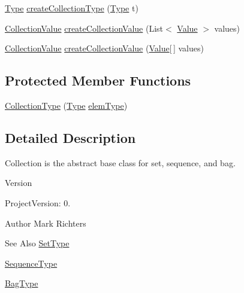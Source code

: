 \begin{DoxyCompactItemize}
\item 
\hyperlink{interfaceorg_1_1tzi_1_1use_1_1uml_1_1ocl_1_1type_1_1_type}{Type} \hyperlink{classorg_1_1tzi_1_1use_1_1uml_1_1ocl_1_1type_1_1_collection_type_a47db435ac4e69e64dc5634828d3672ad}{create\-Collection\-Type} (\hyperlink{interfaceorg_1_1tzi_1_1use_1_1uml_1_1ocl_1_1type_1_1_type}{Type} t)
\item 
\hyperlink{classorg_1_1tzi_1_1use_1_1uml_1_1ocl_1_1value_1_1_collection_value}{Collection\-Value} \hyperlink{classorg_1_1tzi_1_1use_1_1uml_1_1ocl_1_1type_1_1_collection_type_af3b404bd3c37a93ac9de08ef0693319b}{create\-Collection\-Value} (List$<$ \hyperlink{classorg_1_1tzi_1_1use_1_1uml_1_1ocl_1_1value_1_1_value}{Value} $>$ values)
\item 
\hyperlink{classorg_1_1tzi_1_1use_1_1uml_1_1ocl_1_1value_1_1_collection_value}{Collection\-Value} \hyperlink{classorg_1_1tzi_1_1use_1_1uml_1_1ocl_1_1type_1_1_collection_type_abec9360079937fe98f8bf7ea2ccf951f}{create\-Collection\-Value} (\hyperlink{classorg_1_1tzi_1_1use_1_1uml_1_1ocl_1_1value_1_1_value}{Value}\mbox{[}$\,$\mbox{]} values)
\end{DoxyCompactItemize}
\subsection*{Protected Member Functions}
\begin{DoxyCompactItemize}
\item 
\hyperlink{classorg_1_1tzi_1_1use_1_1uml_1_1ocl_1_1type_1_1_collection_type_af046c9bf4f239a18d4e036c835855b46}{Collection\-Type} (\hyperlink{interfaceorg_1_1tzi_1_1use_1_1uml_1_1ocl_1_1type_1_1_type}{Type} \hyperlink{classorg_1_1tzi_1_1use_1_1uml_1_1ocl_1_1type_1_1_collection_type_a51cda1902aa2b4a9be4a40fa9b5b7aab}{elem\-Type})
\end{DoxyCompactItemize}


\subsection{Detailed Description}
Collection is the abstract base class for set, sequence, and bag.

\begin{DoxyVersion}{Version}

\end{DoxyVersion}
\begin{DoxyParagraph}{Project\-Version\-:}
0. 
\end{DoxyParagraph}
\begin{DoxyAuthor}{Author}
Mark Richters 
\end{DoxyAuthor}
\begin{DoxySeeAlso}{See Also}
\hyperlink{classorg_1_1tzi_1_1use_1_1uml_1_1ocl_1_1type_1_1_set_type}{Set\-Type} 

\hyperlink{classorg_1_1tzi_1_1use_1_1uml_1_1ocl_1_1type_1_1_sequence_type}{Sequence\-Type} 

\hyperlink{classorg_1_1tzi_1_1use_1_1uml_1_1ocl_1_1type_1_1_bag_type}{Bag\-Type} 
\end{DoxySeeAlso}


